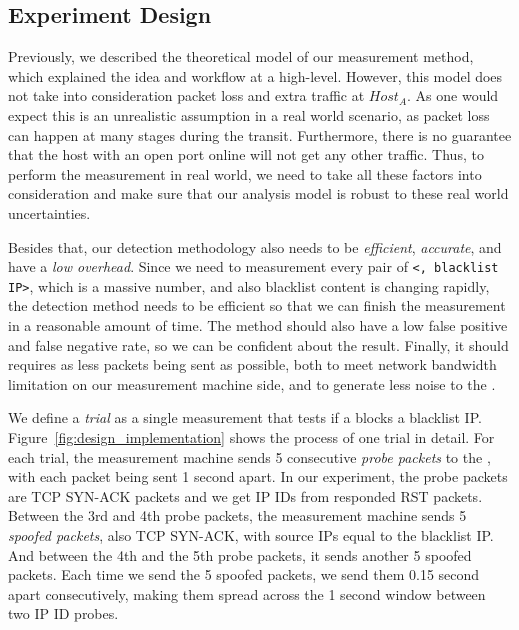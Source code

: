 \subsection{Experiment Design}

Previously, we described the theoretical model of our measurement method,
which explained the idea and workflow at a high-level. However, this model
does not take into consideration packet loss and extra traffic at
$Host_A$. As one would expect this is an unrealistic assumption in a real
world scenario, as packet loss can happen at many stages during the transit.
Furthermore, there is no guarantee that the host with an open port online
will not get any other traffic. Thus, to perform the measurement in real
world, we need to take all these factors into consideration and make sure
that our analysis model is robust to these real world uncertainties.

Besides that, our detection methodology also needs to be \textit{efficient},
\textit{accurate}, and have a \textit{low overhead}. Since we need to
measurement every pair of \texttt{<{}, blacklist IP>}, which is a
massive number, and also blacklist content is changing rapidly,
the detection method needs to be efficient so that we can finish the
measurement in a reasonable amount of time. The method should also have a low
false positive and false negative rate, so we can be confident about the result.
Finally, it should requires as less packets being sent as possible, both to
meet network bandwidth limitation on our measurement machine side, and to
generate less noise to the {}.

We define a \textit{trial} as a single
measurement that tests if a {} blocks a blacklist IP.
Figure~\ref{fig:design_implementation} shows the process of one trial in
detail. For each trial, the measurement machine sends 5 consecutive
\textit{probe packets} to the {}, with each packet being sent 1
second apart. In our experiment, the probe packets are TCP SYN-ACK packets
and we get IP IDs from responded RST packets. Between the 3rd and 4th probe
packets, the measurement machine sends 5 \textit{spoofed packets}, also TCP
SYN-ACK, with source IPs equal to the blacklist IP. And between the 4th and
the 5th probe packets, it sends another 5 spoofed packets. Each time we send
the 5 spoofed packets, we send them 0.15 second apart consecutively, making
them spread across the 1 second window between two IP ID probes.

